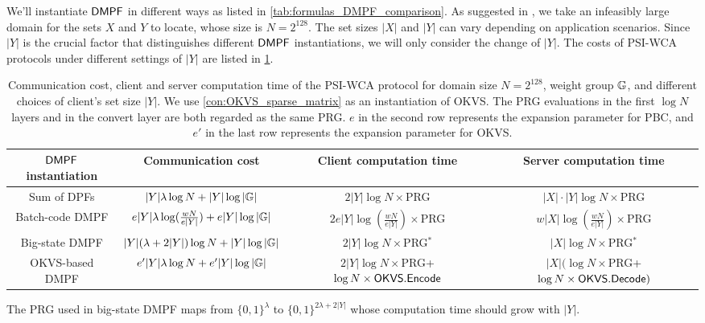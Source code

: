 We'll instantiate ${\sf DMPF}$ in different ways as listed in \cref{tab:formulas_DMPF_comparison}. As suggested in \cite{cryptoeprint:2020/1599}, we take an infeasibly large domain for the sets $X$ and $Y$ to locate, whose size is $N = 2^{128}$. The set sizes $|X|$ and $|Y|$ can vary depending on application scenarios. Since $|Y|$ is the crucial factor that distinguishes different ${\sf DMPF}$ instantiations, we will only consider the change of $|Y|$. The costs of PSI-WCA protocols under different settings of $|Y|$ are listed in \cref{tab:PSI_plug_in_formula}. 


\begin{table*}
  \renewcommand\arraystretch{1.5}
  \begin{threeparttable}
  \caption{Communication cost, client and server computation time of the PSI-WCA protocol for domain size $N = 2^{128}$, weight group $\mathbb{G}$, and  different choices of client's set size $|Y|$. We use \cref{con:OKVS_sparse_matrix} as an instantiation of OKVS. The PRG evaluations in the first $\log N$ layers and in the convert layer are both regarded as the same PRG. $e$ in the second row represents the expansion parameter for PBC, and $e'$ in the last row represents the expansion parameter for OKVS. }
\label{tab:PSI_plug_in_formula}
  \begin{tabular}{cccc}
          \toprule
    ${\sf DMPF}$ instantiation & Communication cost & Client computation time & Server computation time \\
          \midrule

          Sum of DPFs & $|Y|\lambda\log N+|Y|\log|\mathbb{G}|$ & $2|Y|\log N\times $PRG & $|X|\cdot |Y|\log N\times $PRG\\

          Batch-code DMPF & $e|Y|\lambda\log(\frac{wN}{e|Y|})+e|Y|\log|\mathbb{G}|$ & $2e|Y|\log(\frac{wN}{e|Y|})\times$PRG & $w|X|\log(\frac{wN}{e|Y|})\times$PRG\\

          Big-state DMPF & $|Y|(\lambda+2|Y|)\log N+|Y|\log|\mathbb{G}|$ & $2|Y|\log N\times $PRG$^*$\tnote{1} & $|X|\log N \times$PRG$^*$\\

          OKVS-based DMPF& $e'|Y|\lambda\log N +e'|Y|\log|\mathbb{G}|$ & $2|Y|\log N\times$PRG+$\log N\times {\sf OKVS}.{\sf Encode}$ & $|X|(\log N\times$PRG+$\log N\times {\sf OKVS}.{\sf Decode})$\\
          \bottomrule
  \end{tabular}
  \begin{tablenotes}
    \item [1] The PRG used in big-state DMPF maps from $\{0,1\}^\lambda$ to $\{0,1\}^{2\lambda+2|Y|}$ whose computation time should grow with $|Y|$.
  \end{tablenotes}
\end{threeparttable}
\end{table*}



